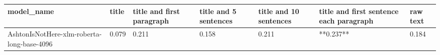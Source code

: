 \begin{tabular}{lllllll}
\toprule
                                model\_name & title & title and first paragraph & title and 5 sentences & title and 10 sentences & title and first sentence each paragraph & raw text \\
\midrule
AshtonIsNotHere-xlm-roberta-long-base-4096 & 0.079 &                     0.211 &                 0.158 &                  0.211 &                               **0.237** &    0.184 \\
\bottomrule
\end{tabular}
